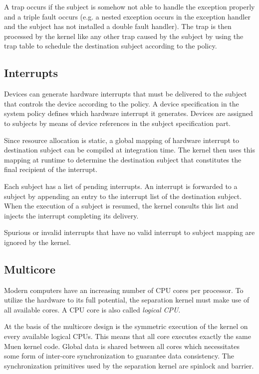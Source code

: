 A trap occurs if the subject is somehow not able to handle the exception
properly and a triple fault occurs (e.g. a nested exception occurs in the
exception handler and the subject has not installed a double fault handler).
The trap is then processed by the kernel like any other trap caused by the
subject by using the trap table to schedule the destination subject according to
the policy.

\subsection{Interrupts}
Devices can generate hardware interrupts that must be delivered to the subject
that controls the device according to the policy. A device specification in the
system policy defines which hardware interrupt it generates. Devices are
assigned to subjects by means of device references in the subject specification
part.

Since resource allocation is static, a global mapping of hardware interrupt to
destination subject can be compiled at integration time. The kernel then uses
this mapping at runtime to determine the destination subject that constitutes
the final recipient of the interrupt.

Each subject has a list of pending interrupts. An interrupt is forwarded to a
subject by appending an entry to the interrupt list of the destination subject.
When the execution of a subject is resumed, the kernel consults this list and
injects the interrupt completing its delivery.

Spurious or invalid interrupts that have no valid interrupt to subject mapping
are ignored by the kernel.

\subsection{Multicore}\label{subsec:multicore}
Modern computers have an increasing number of CPU cores per processor. To
utilize the hardware to its full potential, the separation kernel must make use
of all available cores. A CPU core is also called \emph{logical CPU}.

At the basis of the multicore design is the symmetric execution of the kernel on
every available logical CPUs. This means that all core executes exactly the same
Muen kernel code. Global data is shared between all cores which necessitates
some form of inter-core synchronization to guarantee data consistency. The
synchronization primitives used by the separation kernel are spinlock and
barrier.

